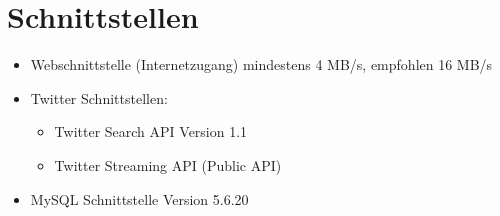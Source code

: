 \section{Schnittstellen}
   \begin{itemize}
   \item Webschnittstelle (Internetzugang) mindestens 4 MB/s, empfohlen 16 MB/s
	\item Twitter Schnittstellen:
	\begin{itemize}
	\item Twitter Search API Version 1.1
	\item Twitter Streaming API (Public API)
	\end{itemize}
\item MySQL Schnittstelle Version 5.6.20
   \end{itemize}